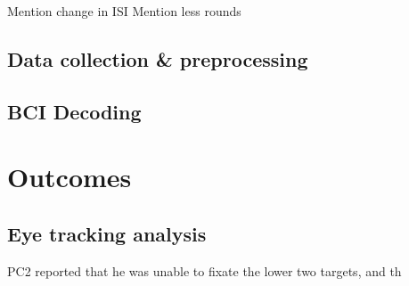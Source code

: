 Mention change in ISI
Mention less rounds

\subsection{Data collection \& preprocessing}

\subsection{BCI Decoding}

\section{Outcomes}

\subsection{Eye tracking analysis}

PC2 reported that he was unable to fixate the lower two targets, and th

